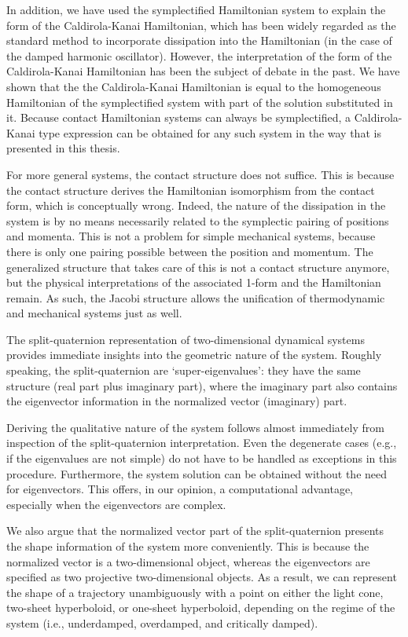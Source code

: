 In addition, we have used the symplectified Hamiltonian system to explain the form of the Caldirola-Kanai Hamiltonian, which has been widely regarded as the standard method to incorporate dissipation into the Hamiltonian (in the case of the damped harmonic oscillator). However, the interpretation of the form of the Caldirola-Kanai Hamiltonian has been the subject of debate in the past. We have shown that the the Caldirola-Kanai Hamiltonian is equal to the homogeneous Hamiltonian of the symplectified system with part of the solution substituted in it.
Because contact Hamiltonian systems can always be symplectified, a Caldirola-Kanai type expression can be obtained for any such system in the way that is presented in this thesis.

For more general systems, the contact structure does not suffice. This is because the contact structure derives the Hamiltonian isomorphism from the contact form, which is conceptually wrong. Indeed, the nature of the dissipation in the system is by no means necessarily related to the symplectic pairing of positions and momenta. This is not a problem for simple mechanical systems, because there is only one pairing possible between the position and momentum. The generalized structure that takes care of this is not a contact structure anymore, but the physical interpretations of the associated 1-form and the Hamiltonian remain. As such, the Jacobi structure allows the unification of thermodynamic and mechanical systems just as well.

The split-quaternion representation of two-dimensional dynamical systems provides immediate insights into the geometric nature of the system. Roughly speaking, the split-quaternion are `super-eigenvalues': they have the same structure (real part plus imaginary part), where the imaginary part also contains the eigenvector information in the normalized vector (imaginary) part.

Deriving the qualitative nature of the system follows almost immediately from inspection of the split-quaternion interpretation. Even the degenerate cases (e.g., if the eigenvalues are not simple) do not have to be handled as exceptions in this procedure. 
Furthermore, the system solution can be obtained without the need for eigenvectors. This offers, in our opinion, a computational advantage, especially when the eigenvectors are complex.

We also argue that the normalized vector part of the split-quaternion presents the shape information of the system more conveniently. This is because the normalized vector is a two-dimensional object, whereas the eigenvectors are specified as two projective two-dimensional objects. As a result, we can represent the shape of a trajectory unambiguously with a point on either the light cone, two-sheet hyperboloid, or one-sheet hyperboloid, depending on the regime of the system (i.e., underdamped, overdamped, and critically damped).

